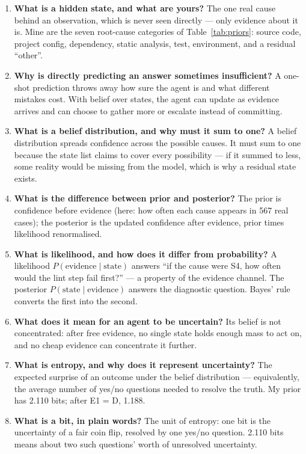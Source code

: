 \documentclass{article}
\begin{document}
\begin{enumerate}
\item \textbf{What is a hidden state, and what are yours?} The one real cause behind an observation, which is never seen directly --- only evidence about it is. Mine are the seven root-cause categories of Table~\ref{tab:priors}: source code, project config, dependency, static analysis, test, environment, and a residual ``other''.
\item \textbf{Why is directly predicting an answer sometimes insufficient?} A one-shot prediction throws away how sure the agent is and what different mistakes cost. With belief over states, the agent can update as evidence arrives and can choose to gather more or escalate instead of committing.
\item \textbf{What is a belief distribution, and why must it sum to one?} A belief distribution spreads confidence across the possible causes. It must sum to one because the state list claims to cover every possibility --- if it summed to less, some reality would be missing from the model, which is why a residual state exists.
\item \textbf{What is the difference between prior and posterior?} The prior is confidence before evidence (here: how often each cause appears in 567 real cases); the posterior is the updated confidence after evidence, prior times likelihood renormalised.
\item \textbf{What is likelihood, and how does it differ from probability?} A likelihood $P(\text{evidence} \mid \text{state})$ answers ``if the cause were S4, how often would the lint step fail first?'' --- a property of the evidence channel. The posterior $P(\text{state} \mid \text{evidence})$ answers the diagnostic question. Bayes' rule converts the first into the second.
\item \textbf{What does it mean for an agent to be uncertain?} Its belief is not concentrated: after free evidence, no single state holds enough mass to act on, and no cheap evidence can concentrate it further.
\item \textbf{What is entropy, and why does it represent uncertainty?} The expected surprise of an outcome under the belief distribution --- equivalently, the average number of yes/no questions needed to resolve the truth. My prior has 2.110 bits; after E1 = D, 1.188.
\item \textbf{What is a bit, in plain words?} The unit of entropy: one bit is the uncertainty of a fair coin flip, resolved by one yes/no question. 2.110 bits means about two such questions' worth of unresolved uncertainty.

\end{enumerate}
\end{document}
